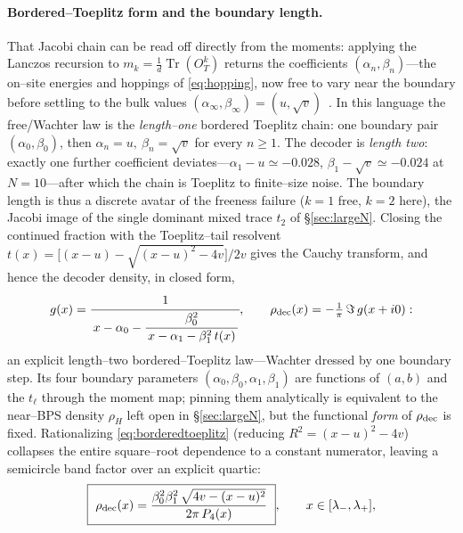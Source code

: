\documentclass[11pt]{article}
\newcommand{\Tr}{\operatorname{Tr}}
\newcommand{\OT}{O_T}
\begin{document}
\paragraph{Bordered--Toeplitz form and the boundary length.} That Jacobi chain can be read off directly
from the moments: applying the Lanczos recursion to $m_k=\tfrac1d\Tr(\OT^k)$ returns the coefficients
$(\alpha_n,\beta_n)$---the on--site energies and hoppings of \eqref{eq:hopping}, now free to vary near
the boundary before settling to the bulk values $(\alpha_\infty,\beta_\infty)=(u,\sqrt v)$~\cite{DubbsEdelman}.
In this language the free/Wachter law is the \emph{length--one} bordered Toeplitz chain: one boundary
pair $(\alpha_0,\beta_0)$, then $\alpha_n=u,\ \beta_n=\sqrt v$ for every $n\ge1$. The decoder is
\emph{length two}: exactly one further coefficient deviates---$\alpha_1-u\simeq-0.028$,
$\beta_1-\sqrt v\simeq-0.024$ at $N=10$---after which the chain is Toeplitz to finite--size noise. The
boundary length is thus a discrete avatar of the freeness failure ($k=1$ free, $k=2$ here), the Jacobi
image of the single dominant mixed trace $t_2$ of \S\ref{sec:largeN}. Closing the continued fraction
with the Toeplitz--tail resolvent $t(x)=\big[(x-u)-\sqrt{(x-u)^2-4v}\big]/2v$ gives the Cauchy transform,
and hence the decoder density, in closed form,
\begin{equation}
  g(x)=\cfrac{1}{\,x-\alpha_0-\cfrac{\beta_0^{2}}{\,x-\alpha_1-\beta_1^{2}\,t(x)\,}\,},
  \qquad \rho_{\rm dec}(x)=-\tfrac1\pi\,\Im\,g(x+i0):
  \label{eq:borderedtoeplitz}
\end{equation}
an explicit length--two bordered--Toeplitz law---Wachter dressed by one boundary step. Its four boundary
parameters $(\alpha_0,\beta_0,\alpha_1,\beta_1)$ are functions of $(a,b)$ and the $t_\ell$ through the
moment map; pinning them analytically is equivalent to the near--BPS density $\rho_H$ left open in
\S\ref{sec:largeN}, but the functional \emph{form} of $\rho_{\rm dec}$ is fixed. Rationalizing
\eqref{eq:borderedtoeplitz} (reducing $R^2=(x-u)^2-4v$) collapses the entire square--root dependence to a
constant numerator, leaving a semicircle band factor over an explicit quartic:
\begin{equation}
  \boxed{\ \rho_{\rm dec}(x)=\frac{\beta_0^{2}\beta_1^{2}\,\sqrt{4v-(x-u)^2}}{2\pi\,P_4(x)}\ },
  \qquad x\in[\lambda_-,\lambda_+],
  \label{eq:rhodec}
\end{equation}
\end{document}
